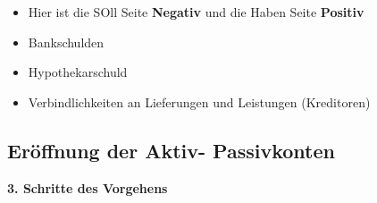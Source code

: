 \begin{itemize}
\begin{itemize}
        \item Hier ist die SOll Seite \textbf{Negativ} und die Haben Seite \textbf{Positiv} 

        \item Bankschulden 

        \item Hypothekarschuld

        \item Verbindlichkeiten an Lieferungen und Leistungen (Kreditoren)

    \end{itemize}
    \end{itemize}

\pagebreak
\subsection{Eröffnung der Aktiv- Passivkonten}
\textbf{3. Schritte des Vorgehens}
